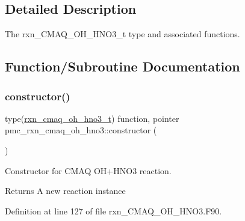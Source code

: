 \subsection{Detailed Description}
The rxn\+\_\+\+C\+M\+A\+Q\+\_\+\+O\+H\+\_\+\+H\+N\+O3\+\_\+t type and associated functions. 

\subsection{Function/\+Subroutine Documentation}
\mbox{\label{namespacepmc__rxn__cmaq__oh__hno3_ac46f8091219be3c798ab6b7fb46aa2df}} 
\subsubsection{\texorpdfstring{constructor()}{constructor()}}
{\footnotesize\ttfamily type(\mbox{\hyperlink{structpmc__rxn__cmaq__oh__hno3_1_1rxn__cmaq__oh__hno3__t}{rxn\+\_\+cmaq\+\_\+oh\+\_\+hno3\+\_\+t}}) function, pointer pmc\+\_\+rxn\+\_\+cmaq\+\_\+oh\+\_\+hno3\+::constructor (\begin{DoxyParamCaption}{ }\end{DoxyParamCaption})\hspace{0.3cm}{\ttfamily [private]}}



Constructor for C\+M\+AQ O\+H+\+H\+N\+O3 reaction. 

\begin{DoxyReturn}{Returns}
A new reaction instance 
\end{DoxyReturn}


Definition at line 127 of file rxn\+\_\+\+C\+M\+A\+Q\+\_\+\+O\+H\+\_\+\+H\+N\+O3.\+F90.

\mbox{\label{namespacepmc__rxn__cmaq__oh__hno3_aa017d117b8160d6df85e72882a738e69}} 
